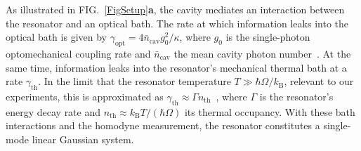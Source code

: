 \documentclass[aps,prx,twocolumn,amsmath,amssymb,superscriptaddress,floatfix,longbibliography
]{revtex4-2}
\begin{document}
As illustrated in FIG.~\ref{FigSetup}\textbf{a}, the cavity mediates an interaction between the resonator and an optical bath. The rate at which information leaks into 
the optical bath is given by $\gamma_\text{opt} = 4\bar{n}_\text{cav} g_0^2/\kappa$, where $g_0$ is the single-photon optomechanical coupling rate and $\bar{n}_\text{cav}$ the mean cavity photon number~\cite{bowen2015quantum,meng2020mechanical}. At the same time, information leaks into the resonator's mechanical thermal bath at a rate $\gamma_\text{th}$. In the limit that the resonator temperature $T \gg \hbar \Omega/k_\text{B}$, relevant to our experiments, this is approximated as $\gamma_\text{th} \approx \Gamma n_\text{th}$~\cite{aspelmeyer2014cavity}, where $\Gamma$ is the resonator's energy decay rate and $n_\text{th}\approx k_\text{B} T/(\hbar \Omega)$ its thermal occupancy. %
With these bath interactions and the homodyne measurement, the resonator constitutes a single-mode linear Gaussian system.
\end{document}
